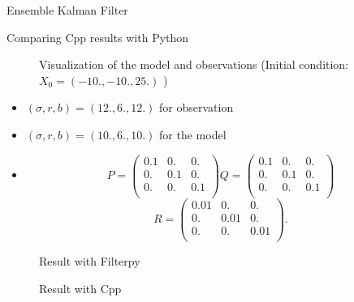 \begin{frame}{Ensemble Kalman Filter}
    \begin{figure}[H]
	\end{figure}
\end{frame}
\begin{frame}[allowframebreaks]{Comparing Cpp results with Python}
\begin{minipage}{0.4\hsize}
			\centering
	\begin{figure}[H]
		\caption{Visualization of the model and observations (Initial condition: $X_0=(-10.,-10.,25.) $ )}
	\end{figure}
		\end{minipage} \quad
		\begin{minipage}{0.5\hsize}
			\begin{itemize}
    \item $(\sigma, r, b)=(12.,6.,12.)$ for observation
    \item $(\sigma, r, b)=(10.,6.,10.)$ for the model
    \item $$P=\begin{pmatrix}
            0.1 & 0. & 0. \\
            0. & 0.1 & 0. \\
            0. & 0. & 0.1 \\
            \end{pmatrix}
            Q=\begin{pmatrix}
            0.1 & 0. & 0. \\
            0. & 0.1 & 0. \\
            0. & 0. & 0.1 \\
            \end{pmatrix}$$
            \newline
            $$R=\begin{pmatrix}
            0.01 & 0. & 0. \\
            0. & 0.01 & 0. \\
            0. & 0. & 0.01 \\
            \end{pmatrix}.$$ 
    \end{itemize}
		\end{minipage}
		
\newpage
\centering
	\begin{figure}[H]
		\caption{Result with Filterpy}
	\end{figure}

\newpage
\centering
	\begin{figure}[H]
		\caption{Result with Cpp}
	\end{figure}

\end{frame}
